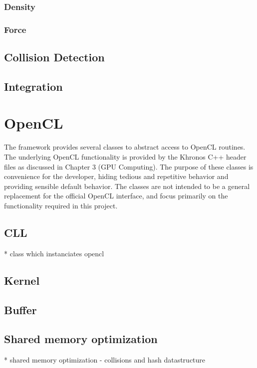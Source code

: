 \subsubsection{Density}

\subsubsection{Force}


\subsection{Collision Detection}


\subsection{Integration}



\section{OpenCL}

The framework provides several classes to abstract access to OpenCL routines.
The underlying OpenCL functionality is provided by the Khronos C++ header files
as discussed in Chapter 3 (GPU Computing).
The purpose of these classes is convenience for the developer, hiding tedious
and repetitive behavior and providing sensible default behavior. The classes
are not intended to be a general replacement for the official OpenCL interface,
and focus primarily on the functionality required in this project.



\subsection{CLL}
* class which instanciates opencl

\subsection{Kernel}


\subsection{Buffer}


\subsection{Shared memory optimization}
* shared memory optimization - collisions and hash datastructure 


